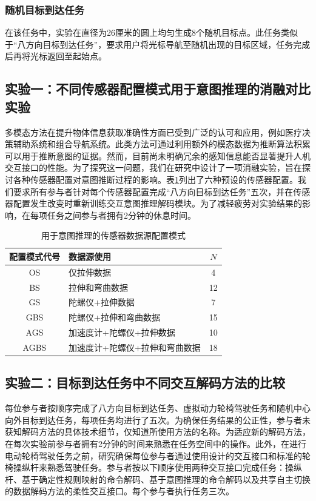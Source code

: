    \subsubsection{随机目标到达任务}在该任务中，实验在直径为26厘米的圆上均匀生成8个随机目标点。此任务类似于“八方向目标到达任务”，要求用户将光标导航至随机出现的目标区域，任务完成后再将光标返回至起始点。

\subsection{实验一：不同传感器配置模式用于意图推理的消融对比实验} 多模态方法在提升物体信息获取准确性方面已受到广泛的认可和应用，例如医疗决策辅助系统和组合导航系统\cite{williamsonContinuousUncertainInteraction2006}。此类方法可通过利用额外的模态数据为推断算法积累可以用于推断意图的证据。然而，目前尚未明确冗余的感知信息能否显著提升人机交互接口的性能。为了探究这一问题，我们在研究中设计了一项消融实验，旨在探讨各种传感器配置对意图推断过程的影响。表\ref{tab3-1}列出了六种预设的传感器配置。我们要求所有参与者针对每个传感器配置完成``八方向目标到达任务''五次，并在传感器配置发生改变时重新训练交互意图推理解码模块。为了减轻疲劳对实验结果的影响，在每项任务之间参与者拥有2分钟的休息时间。 

\begin{table}
    \centering
    \caption{用于意图推理的传感器数据源配置模式}
    \setlength{\tabcolsep}{3pt}
    \begin{tabular}{c p{180pt} c }
    \hline\hline
    配置模式代号 & 数据源使用 & $N$ \\ 
    \hline
    OS& 仅拉伸数据& 4 \\ 
    BS& 拉伸和弯曲数据&12 \\ 
    GS& 陀螺仪+拉伸数据&7 \\ 
    GBS& 陀螺仪+拉伸和弯曲数据&15 \\ 
    AGS& 加速度计+陀螺仪+拉伸数据&10 \\ 
    AGBS& 加速度计+陀螺仪+拉伸和弯曲数据&18 \\ 
    \hline\hline
    \end{tabular}
    \label{tab3-1}
\end{table}     

\subsection{实验二：目标到达任务中不同交互解码方法的比较} 每位参与者按顺序完成了八方向目标到达任务、虚拟动力轮椅驾驶任务和随机中心向外目标到达任务，每项任务均进行了五次。为确保任务结果的公正性，参与者未获知解码方法的具体技术细节，仅知道所使用方法的名称。为适应新的解码方法，在每次实验前参与者拥有2分钟的时间来熟悉在任务空间中的操作。此外，在进行电动轮椅驾驶任务之前，研究确保每位参与者通过使用设计的交互接口和标准的轮椅操纵杆来熟悉驾驶任务。参与者按以下顺序使用两种交互接口完成任务：操纵杆、基于确定性规则映射的命令解码、基于意图推理的命令解码以及共享自主切换的数据解码方法的柔性交互接口。每个参与者执行任务三次。 

